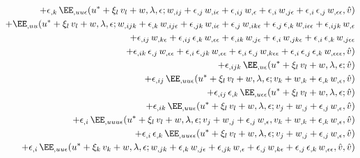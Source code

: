 \begin{equation}
\begin{aligned}[b]
    + \epsilon_{,k} \, \EE_{,uu\epsilon}(u^\ast + \xi_l \, v_l + w, \lambda, \epsilon; w_{,ij} + \epsilon_{,j} \, w_{,i\epsilon} + \epsilon_{,ij} \, w_{,\epsilon} + \epsilon_{,i} \, w_{,j\epsilon} + \epsilon_{,i} \, \epsilon_{,j} \, w_{,\epsilon\epsilon} , \hat{v})&\\
    + \EE_{,uu}(u^\ast + \xi_l \, v_l + w, \lambda, \epsilon; w_{,ijk} + \epsilon_{,k} \, w_{,ij\epsilon}+ \epsilon_{,jk} \, w_{,i\epsilon} + \epsilon_{,j} \, w_{,ik\epsilon} + \epsilon_{,j} \, \epsilon_{,k} \, w_{,i\epsilon\epsilon} + \epsilon_{,ijk} \, w_{,\epsilon} &\\
    + \epsilon_{,ij} \, w_{,k\epsilon} + \epsilon_{,ij} \, \epsilon_{,k} \, w_{,\epsilon\epsilon} + \epsilon_{,ik} \, w_{,j\epsilon} + \epsilon_{,i} \, w_{,jk\epsilon} + \epsilon_{,i} \, \epsilon_{,k} \, w_{,j\epsilon\epsilon} &\\+ \epsilon_{,ik} \, \epsilon_{,j} \, w_{,\epsilon\epsilon} + \epsilon_{,i} \, \epsilon_{,jk} \, w_{,\epsilon\epsilon} + \epsilon_{,i} \, \epsilon_{,j} \, w_{,k\epsilon\epsilon} + \epsilon_{,i} \, \epsilon_{,j} \, \epsilon_{,k} \, w_{,\epsilon\epsilon\epsilon}, \hat{v})&\\
    + \epsilon_{,ijk} \, \EE_{,u\epsilon}(u^\ast + \xi_l \, v_l + w, \lambda, \epsilon; \hat{v})&\\
    + \epsilon_{,ij} \, \EE_{,uu\epsilon}(u^\ast + \xi_l \, v_l + w, \lambda, \epsilon; v_k + w_{,k} + \epsilon_{,k} \, w_{,\epsilon}, \hat{v})&\\
    + \epsilon_{,ij} \, \epsilon_{,k} \, \EE_{,u\epsilon\epsilon}(u^\ast + \xi_l \, v_l + w, \lambda, \epsilon; \hat{v})&\\
    + \epsilon_{,ik} \, \EE_{,uu\epsilon}(u^\ast + \xi_l \, v_l + w, \lambda, \epsilon; v_j + w_{,j} + \epsilon_{,j} \, w_{,\epsilon}, \hat{v})&\\
    + \epsilon_{,i} \, \EE_{,uuu\epsilon}(u^\ast + \xi_l \, v_l + w, \lambda, \epsilon; v_j + w_{,j} + \epsilon_{,j} \, w_{,\epsilon}, v_k + w_{,k} + \epsilon_{,k} \, w_{,\epsilon}, \hat{v})&\\
    + \epsilon_{,i} \, \epsilon_{,k} \, \EE_{,uu\epsilon\epsilon}(u^\ast + \xi_l \, v_l + w, \lambda, \epsilon; v_j + w_{,j} + \epsilon_{,j} \, w_{,\epsilon}, \hat{v})&\\
    + \epsilon_{,i} \, \EE_{,uu\epsilon}(u^\ast + \xi_k \, v_k + w, \lambda, \epsilon; w_{,jk} + \epsilon_{,k} \, w_{,j\epsilon} + \epsilon_{,jk} \,  w_{,\epsilon} + \epsilon_{,j} \,  w_{,k\epsilon} + \epsilon_{,j} \, \epsilon_{,k}\,  w_{,\epsilon\epsilon}, \hat{v}, \hat{v})&\\

\end{aligned}
\end{equation}
